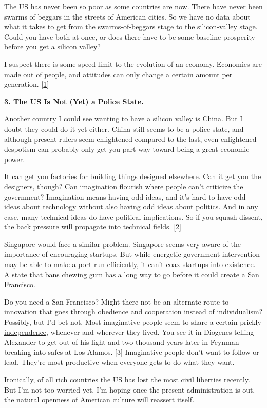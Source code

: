 The US has never been so poor as some countries are now. There have
never been swarms of beggars in the streets of American cities. So we
have no data about what it takes to get from the swarms-of-beggars stage
to the silicon-valley stage. Could you have both at once, or does there
have to be some baseline prosperity before you get a silicon valley?

I suspect there is some speed limit to the evolution of an economy.
Economies are made out of people, and attitudes can only change a
certain amount per generation. {[}\hyperref[f1n]{1}{]}

\textbf{3. The US Is Not (Yet) a Police State.}

Another country I could see wanting to have a silicon valley is China.
But I doubt they could do it yet either. China still seems to be a
police state, and although present rulers seem enlightened compared to
the last, even enlightened despotism can probably only get you part way
toward being a great economic power.

It can get you factories for building things designed elsewhere. Can it
get you the designers, though? Can imagination flourish where people
can't criticize the government? Imagination means having odd ideas, and
it's hard to have odd ideas about technology without also having odd
ideas about politics. And in any case, many technical ideas do have
political implications. So if you squash dissent, the back pressure will
propagate into technical fields. {[}\hyperref[f2n]{2}{]}

Singapore would face a similar problem. Singapore seems very aware of
the importance of encouraging startups. But while energetic government
intervention may be able to make a port run efficiently, it can't coax
startups into existence. A state that bans chewing gum has a long way to
go before it could create a San Francisco.

Do you need a San Francisco? Might there not be an alternate route to
innovation that goes through obedience and cooperation instead of
individualism? Possibly, but I'd bet not. Most imaginative people seem
to share a certain prickly \href{gba.html}{independence}, whenever and
wherever they lived. You see it in Diogenes telling Alexander to get out
of his light and two thousand years later in Feynman breaking into safes
at Los Alamos. {[}\hyperref[f3n]{3}{]} Imaginative people don't want to
follow or lead. They're most productive when everyone gets to do what
they want.

Ironically, of all rich countries the US has lost the most civil
liberties recently. But I'm not too worried yet. I'm hoping once the
present administration is out, the natural openness of American culture
will reassert itself.


